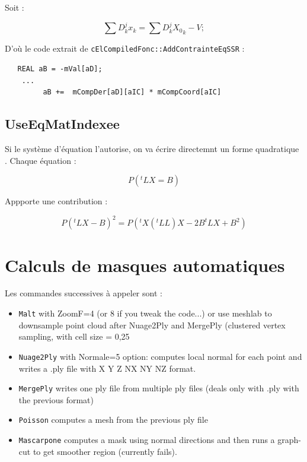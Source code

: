 Soit  :

\begin{equation}
    \sum{D^j_k x_k} =   \sum{D^j_k {X_0}_k} -V;
\end{equation}

D'o\`u le code extrait de {\tt cElCompiledFonc::AddContrainteEqSSR} :

\begin{verbatim}
   REAL aB = -mVal[aD];
    ...
         aB +=  mCompDer[aD][aIC] * mCompCoord[aIC]
\end{verbatim}


\subsection{UseEqMatIndexee}


Si le syst\`eme d'\'equation l'autorise, on va \'ecrire directemnt un forme
quadratique . Chaque \'equation :

\begin{equation}
    P (^t L  X =  B)  
\end{equation}

Appporte une contribution :

\begin{equation}
    P (^t L  X -  B) ^2  = P (^t X (^tLL)X  -2B^tL X + B^2)
\end{equation}

\section{Calculs de masques automatiques}

Les commandes successives \`a appeler sont :

\begin{itemize}
\item {\tt Malt} with ZoomF=4 (or 8 if you tweak the code...) or use meshlab to downsample point cloud after Nuage2Ply and MergePly (clustered vertex sampling, with cell size = 0,25 %
\item {\tt Nuage2Ply} with Normale=5 option: computes local normal for each point and writes a .ply file with X Y Z NX NY NZ format.
\item {\tt MergePly} writes one ply file from multiple ply files (deals only with .ply with the previous format)
\item {\tt Poisson} computes a mesh from the previous ply file
\item {\tt Mascarpone} computes a mask using normal directions and then runs a graph-cut to get smoother region (currently fails).
\end{itemize}

